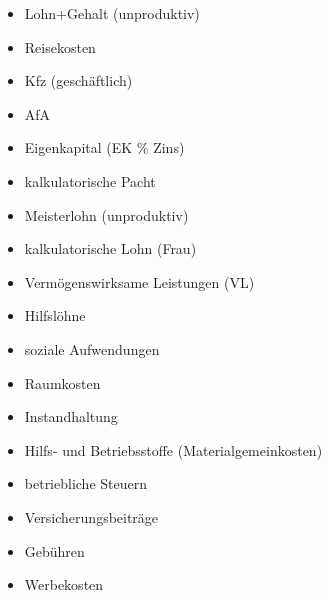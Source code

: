 \begin{itemize}
\item
  Lohn+Gehalt (unproduktiv)
\item
  Reisekosten
\item
  Kfz (geschäftlich)
\item
  AfA
\item
  Eigenkapital (EK \% Zins)
\item
  kalkulatorische Pacht
\item
  Meisterlohn (unproduktiv)
\item
  kalkulatorische Lohn (Frau)
\item
  Vermögenswirksame Leistungen (VL)
\item
  Hilfslöhne
\item
  soziale Aufwendungen
\item
  Raumkosten
\item
  Instandhaltung
\item
  Hilfs- und Betriebsstoffe (Materialgemeinkosten)
\item
  betriebliche Steuern
\item
  Versicherungsbeiträge
\item
  Gebühren
\item
  Werbekosten
\end{itemize}

